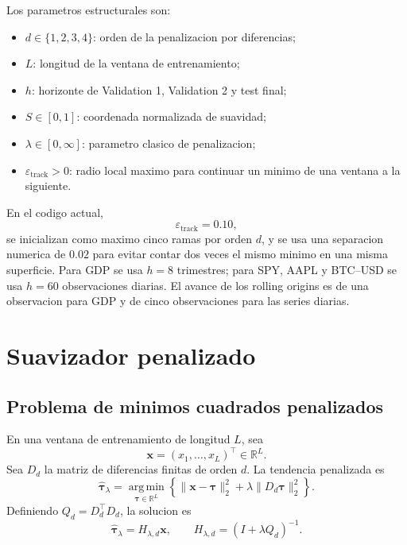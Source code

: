 \documentclass[11pt]{article}
\newcommand{\R}{\mathbb{R}}
\newcommand{\argmin}{\operatorname*{arg\,min}}
\begin{document}
Los parametros estructurales son:
\begin{itemize}[leftmargin=2em]
    \item \(d\in\{1,2,3,4\}\): orden de la penalizacion por diferencias;
    \item \(L\): longitud de la ventana de entrenamiento;
    \item \(h\): horizonte de Validation 1, Validation 2 y test final;
    \item \(S\in[0,1]\): coordenada normalizada de suavidad;
    \item \(\lambda\in[0,\infty]\): parametro clasico de penalizacion;
    \item \(\varepsilon_{\mathrm{track}}>0\): radio local maximo para continuar
    un minimo de una ventana a la siguiente.
\end{itemize}

En el codigo actual,
\[
\varepsilon_{\mathrm{track}}=0.10,
\]
se inicializan como maximo cinco ramas por orden \(d\), y se usa una separacion
numerica de \(0.02\) para evitar contar dos veces el mismo minimo en una misma
superficie. Para GDP se usa \(h=8\) trimestres; para SPY, AAPL y BTC--USD se
usa \(h=60\) observaciones diarias. El avance de los rolling origins es de una
observacion para GDP y de cinco observaciones para las series diarias.

\section{Suavizador penalizado}

\subsection{Problema de minimos cuadrados penalizados}

En una ventana de entrenamiento de longitud \(L\), sea
\[
\bm{x}=(x_1,\ldots,x_L)^\top\in\R^L.
\]
Sea \(D_d\) la matriz de diferencias finitas de orden \(d\). La tendencia
penalizada es
\begin{equation}
\widehat{\bm{\tau}}_{\lambda}
=
\argmin_{\bm{\tau}\in\R^L}
\left\{
\|\bm{x}-\bm{\tau}\|_2^2
+
\lambda\|D_d\bm{\tau}\|_2^2
\right\}.
\label{eq:pls}
\end{equation}
Definiendo \(Q_d=D_d^\top D_d\), la solucion es
\begin{equation}
\widehat{\bm{\tau}}_{\lambda}
=
H_{\lambda,d}\bm{x},
\qquad
H_{\lambda,d}=(I+\lambda Q_d)^{-1}.
\label{eq:smoother}
\end{equation}
\end{document}
